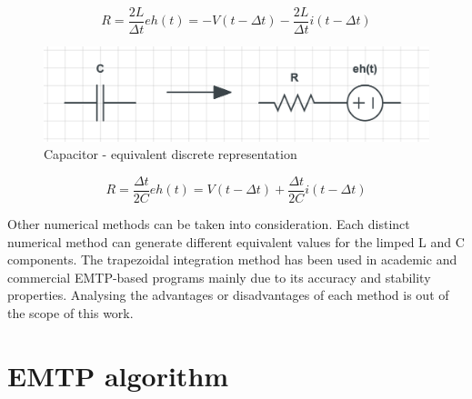 \begin{subequations}
  \begin{equation}
    R = \frac{2 L}{\Delta t}
  \end{equation}
  \begin{equation}
    eh(t) = -V (t - \Delta t) - \frac{2 L}{\Delta t} i (t - \Delta t)
  \end{equation}
\end{subequations}


\begin{figure}[H]
  \caption{Capacitor - equivalent discrete representation}
  \centering
  \begin{minipage}[c]{0.59\linewidth}  
    \includegraphics[width=1\linewidth]{img/Cequiv.png}
  \end{minipage}
  \hfill
  \begin{minipage}[c]{0.3\linewidth}
  \end{minipage}  
  \label{transient3}
\end{figure}

\begin{subequations}
  \begin{equation}
    R = \frac{\Delta t}{2 C}
  \end{equation}
  \begin{equation}
    eh(t) = V (t - \Delta t) + \frac{\Delta t}{2 C} i (t - \Delta t)
  \end{equation}
\end{subequations}


Other numerical methods can be taken into consideration. Each distinct numerical method can generate different equivalent values for the limped L and C components. The trapezoidal integration method has been used in academic and commercial EMTP-based programs mainly due to its accuracy and stability properties. Analysing the advantages or disadvantages of each method is out of the scope of this work.

\section { EMTP algorithm }

